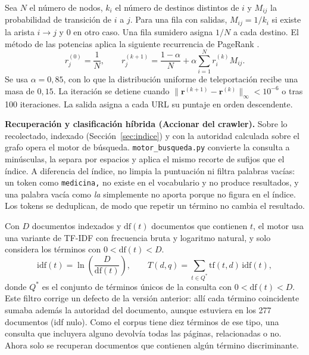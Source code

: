\documentclass[11pt,letterpaper]{article}
\newcommand{\code}[1]{\texttt{\small #1}}
\begin{document}
	Sea \(N\) el número de nodos, \(k_i\) el número de destinos distintos de \(i\) y \(M_{ij}\) la probabilidad de transición de \(i\) a \(j\). Para una fila con salidas, \(M_{ij}=1/k_i\) si existe la arista \(i\to j\) y \(0\) en otro caso. Una fila sumidero asigna \(1/N\) a cada destino. El método de las potencias aplica la siguiente recurrencia de PageRank \cite{pagerank}.
	\begin{equation}
		r_j^{(0)}=\frac{1}{N},\qquad
		r_j^{(k+1)}=\frac{1-\alpha}{N}+\alpha\sum_{i=1}^{N}r_i^{(k)}M_{ij}.
	\end{equation}
	Se usa \(\alpha=0{,}85\), con lo que la distribución uniforme de teleportación recibe una masa de \(0{,}15\). La iteración se detiene cuando \(\lVert \mathbf r^{(k+1)}-\mathbf r^{(k)}\rVert_\infty<10^{-6}\) o tras 100 iteraciones. La salida asigna a cada URL su puntaje en orden descendente.
	
	\textbf{Recuperación y clasificación híbrida (Accionar del crawler).} Sobre lo recolectado, indexado (Sección~\ref{sec:indice}) y con la autoridad calculada sobre el grafo opera el motor de búsqueda. \code{motor\_busqueda.py} convierte la consulta a minúsculas, la separa por espacios y aplica el mismo recorte de sufijos que el índice. A diferencia del índice, no limpia la puntuación ni filtra palabras vacías: un token como \code{medicina,} no existe en el vocabulario y no produce resultados, y una palabra vacía como \emph{la} simplemente no aporta porque no figura en el índice. Los tokens se deduplican, de modo que repetir un término no cambia el resultado.
	
	Con \(D\) documentos indexados y \(\mathrm{df}(t)\) documentos que contienen \(t\), el motor usa una variante de TF-IDF \cite{salton} con frecuencia bruta y logaritmo natural, y solo considera los términos con \(0<\mathrm{df}(t)<D\).
	\begin{equation}
		\mathrm{idf}(t)=\ln\!\left(\frac{D}{\mathrm{df}(t)}\right),\qquad
		T(d,q)=\sum_{t\in Q^{*}}\mathrm{tf}(t,d)\,\mathrm{idf}(t),
	\end{equation}
	donde \(Q^{*}\) es el conjunto de términos únicos de la consulta con \(0<\mathrm{df}(t)<D\). Este filtro corrige un defecto de la versión anterior: allí cada término coincidente sumaba además la autoridad del documento, aunque estuviera en los 277 documentos (idf nulo). Como el corpus tiene diez términos de ese tipo, una consulta que incluyera alguno devolvía todas las páginas, relacionadas o no. Ahora solo se recuperan documentos que contienen algún término discriminante.
	
\end{document}
